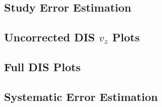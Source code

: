 \subsection*{Study Error Estimation}


\subsection*{Uncorrected DIS $v_z$ Plots}


\subsection*{Full DIS Plots}


\subsection*{Systematic Error Estimation}


